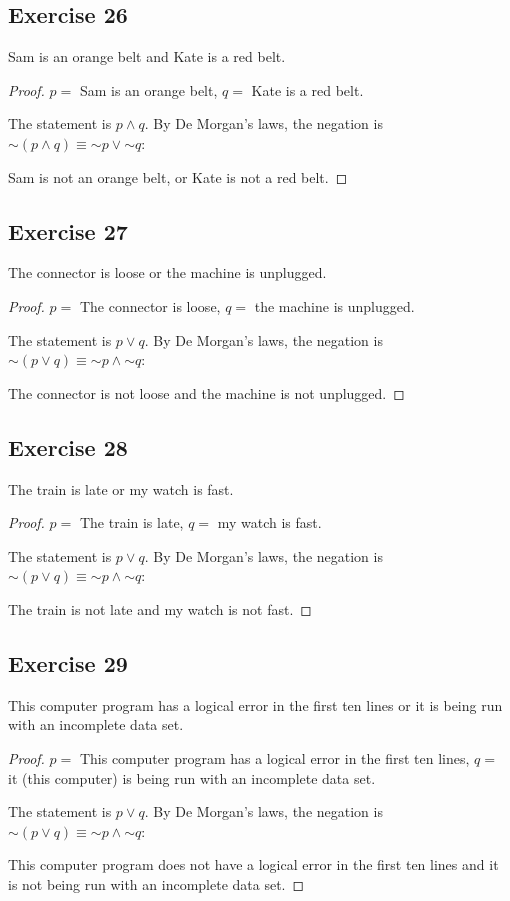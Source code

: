 \documentclass[14pt]{extarticle}
\begin{document}
\subsection{Exercise 26}
Sam is an orange belt and Kate is a red belt.

\begin{proof}
    $p =$ Sam is an orange belt, $q =$ Kate is a red belt.

    The statement is $p \wedge q$. By De Morgan's laws, the negation is $\sim(p \wedge q) \equiv {\sim p} \vee {\sim q}$:

    Sam is not an orange belt, or Kate is not a red belt. \end{proof}

\subsection{Exercise 27}
The connector is loose or the machine is unplugged.

\begin{proof}
    $p =$ The connector is loose, $q =$ the machine is unplugged.

    The statement is $p \vee q$. By De Morgan's laws, the negation is $\sim(p \vee q) \equiv {\sim p} \wedge {\sim q}$:

    The connector is not loose and the machine is not unplugged. \end{proof}

\subsection{Exercise 28}
The train is late or my watch is fast.

\begin{proof}
    $p =$ The train is late, $q =$ my watch is fast.

    The statement is $p \vee q$. By De Morgan's laws, the negation is $\sim(p \vee q) \equiv {\sim p} \wedge {\sim q}$:

    The train is not late and my watch is not fast.
\end{proof}

\subsection{Exercise 29}
This computer program has a logical error in the first ten lines or it is being run with an incomplete data set.

\begin{proof}
    $p =$ This computer program has a logical error in the first ten lines, $q =$ it (this computer) is being run with an incomplete data set.

    The statement is $p \vee q$. By De Morgan's laws, the negation is $\sim(p \vee q) \equiv {\sim p} \wedge {\sim q}$:

    This computer program does not have a logical error in the first ten lines and it is not being run with an incomplete data set.
\end{proof}
\end{document}
